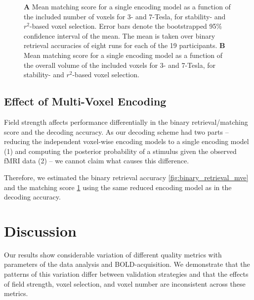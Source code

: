 \begin{figure}
  \centering
  \def\svgwidth{\linewidth}
  
	
  \caption{\textbf{A} Mean matching score for a single encoding model as a
  function of the included number of voxels for 3- and 7-Tesla, for stability-
  and $r^2$-based voxel selection. Error bars denote the bootstrapped 95\%
  confidence interval of the mean. The mean is taken over binary retrieval
  accuracies of eight runs for each of the 19 participants. \textbf{B} Mean
matching score for a single encoding model as a function of the overall volume
of the included voxels for 3- and 7-Tesla, for stability- and $r^2$-based voxel
selection.
}

 \label{fig:matching_score_mve}
\end{figure}

\subsection*{Effect of Multi-Voxel Encoding}


Field strength affects performance differentially in the binary
retrieval/matching score and the decoding accuracy. As our decoding scheme had
two parts -- reducing the independent voxel-wise encoding models to a single
encoding model (1) and computing the posterior probability of a stimulus given
the observed f{MRI} data (2) -- we cannot claim what causes this difference.

Therefore, we estimated the binary retrieval accuracy
\ref{fig:binary_retrieval_mve} and the matching score
\ref{fig:matching_score_mve} using the same reduced encoding model as in the
decoding accuracy.

\section*{Discussion}


Our results show considerable variation of different quality metrics with
parameters of the data analysis and BOLD-acquisition. We demonstrate that the
patterns of this variation differ between validation strategies and that the
effects of field strength, voxel selection, and voxel number are inconsistent
across these metrics.

